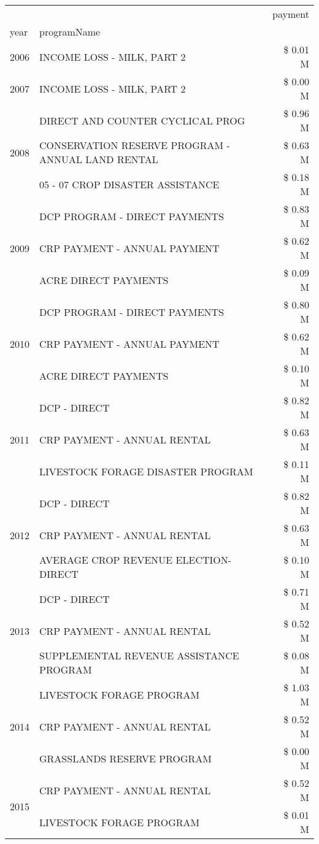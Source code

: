 \begin{tabular}{llr}
\toprule
 &  & payment \\
year & programName &  \\
\midrule
2006 & INCOME LOSS - MILK, PART 2 & \$ 0.01 M \\
\cline{1-3}
2007 & INCOME LOSS - MILK, PART 2 & \$ 0.00 M \\
\cline{1-3}
\multirow[t]{3}{*}{2008} & DIRECT AND COUNTER CYCLICAL PROG & \$ 0.96 M \\
 & CONSERVATION RESERVE PROGRAM - ANNUAL LAND RENTAL & \$ 0.63 M \\
 & 05 - 07 CROP DISASTER ASSISTANCE & \$ 0.18 M \\
\cline{1-3}
\multirow[t]{3}{*}{2009} & DCP PROGRAM - DIRECT PAYMENTS & \$ 0.83 M \\
 & CRP PAYMENT - ANNUAL PAYMENT & \$ 0.62 M \\
 & ACRE DIRECT PAYMENTS & \$ 0.09 M \\
\cline{1-3}
\multirow[t]{3}{*}{2010} & DCP PROGRAM - DIRECT PAYMENTS & \$ 0.80 M \\
 & CRP PAYMENT - ANNUAL PAYMENT & \$ 0.62 M \\
 & ACRE DIRECT PAYMENTS & \$ 0.10 M \\
\cline{1-3}
\multirow[t]{3}{*}{2011} & DCP - DIRECT & \$ 0.82 M \\
 & CRP PAYMENT - ANNUAL RENTAL & \$ 0.63 M \\
 & LIVESTOCK FORAGE DISASTER PROGRAM & \$ 0.11 M \\
\cline{1-3}
\multirow[t]{3}{*}{2012} & DCP - DIRECT & \$ 0.82 M \\
 & CRP PAYMENT - ANNUAL RENTAL & \$ 0.63 M \\
 & AVERAGE CROP REVENUE ELECTION-DIRECT & \$ 0.10 M \\
\cline{1-3}
\multirow[t]{3}{*}{2013} & DCP - DIRECT & \$ 0.71 M \\
 & CRP PAYMENT - ANNUAL RENTAL & \$ 0.52 M \\
 & SUPPLEMENTAL REVENUE ASSISTANCE PROGRAM & \$ 0.08 M \\
\cline{1-3}
\multirow[t]{3}{*}{2014} & LIVESTOCK FORAGE PROGRAM & \$ 1.03 M \\
 & CRP PAYMENT - ANNUAL RENTAL & \$ 0.52 M \\
 & GRASSLANDS RESERVE PROGRAM & \$ 0.00 M \\
\cline{1-3}
\multirow[t]{3}{*}{2015} & CRP PAYMENT - ANNUAL RENTAL & \$ 0.52 M \\
 & LIVESTOCK FORAGE PROGRAM & \$ 0.01 M \\

\end{tabular}
